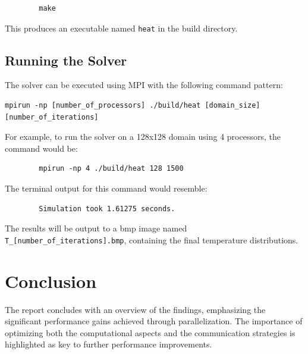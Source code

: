\documentclass[11pt]{article}
\begin{document}
        \begin{verbatim}
        make
        \end{verbatim}

        This produces an executable named \texttt{heat} in the build directory.

        \subsection{Running the Solver}
        The solver can be executed using MPI with the following command pattern:
        
        \begin{verbatim}
mpirun -np [number_of_processors] ./build/heat [domain_size] [number_of_iterations]
        \end{verbatim}

    For example, to run the solver on a 128x128 domain using 4 processors, the command would be:
        
        \begin{verbatim}
        mpirun -np 4 ./build/heat 128 1500
        \end{verbatim}

        The terminal output for this command would resemble:
        
        \begin{verbatim}
        Simulation took 1.61275 seconds.
        \end{verbatim}

        The results will be output to a bmp image named \texttt{T\_[number\_of\_iterations].bmp}, containing the final temperature distributions.

    \section{Conclusion}
        The report concludes with an overview of the findings, emphasizing the significant performance gains achieved through parallelization. The importance of optimizing both the computational aspects and the communication strategies is highlighted as key to further performance improvements.
\end{document}
